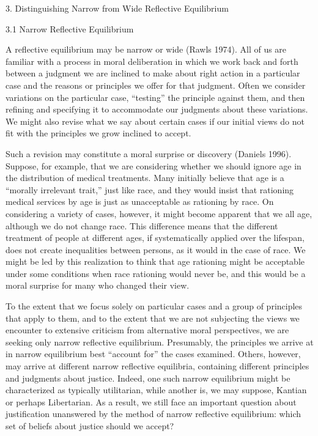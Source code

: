 \documentclass[]{article}
\begin{document}
\protect\hypertarget{DisNarWidRefEqu}{}{3. Distinguishing Narrow from
Wide Reflective Equilibrium}

\protect\hypertarget{NarRefEqu}{}{3.1 Narrow Reflective Equilibrium}

A reflective equilibrium may be narrow or wide (Rawls 1974). All of us
are familiar with a process in moral deliberation in which we work back
and forth between a judgment we are inclined to make about right action
in a particular case and the reasons or principles we offer for that
judgment. Often we consider variations on the particular case,
``testing'' the principle against them, and then refining and specifying
it to accommodate our judgments about these variations. We might also
revise what we say about certain cases if our initial views do not fit
with the principles we grow inclined to accept.

Such a revision may constitute a moral surprise or discovery (Daniels
1996). Suppose, for example, that we are considering whether we should
ignore age in the distribution of medical treatments. Many initially
believe that age is a ``morally irrelevant trait,'' just like race, and
they would insist that rationing medical services by age is just as
unacceptable as rationing by race. On considering a variety of cases,
however, it might become apparent that we all age, although we do not
change race. This difference means that the different treatment of
people at different ages, if systematically applied over the lifespan,
does not create inequalities between persons, as it would in the case of
race. We might be led by this realization to think that age rationing
might be acceptable under some conditions when race rationing would
never be, and this would be a moral surprise for many who changed their
view.

To the extent that we focus solely on particular cases and a group of
principles that apply to them, and to the extent that we are not
subjecting the views we encounter to extensive criticism from
alternative moral perspectives, we are seeking only narrow reflective
equilibrium. Presumably, the principles we arrive at in narrow
equilibrium best ``account for'' the cases examined. Others, however,
may arrive at different narrow reflective equilibria, containing
different principles and judgments about justice. Indeed, one such
narrow equilibrium might be characterized as typically utilitarian,
while another is, we may suppose, Kantian or perhaps Libertarian. As a
result, we still face an important question about justification
unanswered by the method of narrow reflective equilibrium: which set of
beliefs about justice should we accept?
\end{document}
